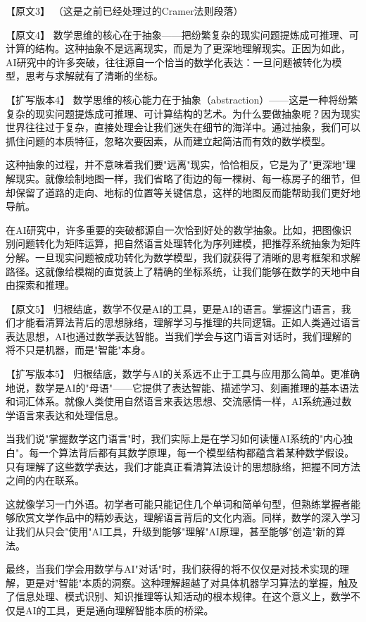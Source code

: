 【原文3】
（这是之前已经处理过的Cramer法则段落）

【原文4】
数学思维的核心在于抽象——把纷繁复杂的现实问题提炼成可推理、可计算的结构。这种抽象不是远离现实，而是为了更深地理解现实。正因为如此，AI研究中的许多突破，往往源自一个恰当的数学化表达：一旦问题被转化为模型，思考与求解就有了清晰的坐标。

【扩写版本4】
数学思维的核心能力在于抽象（abstraction）——这是一种将纷繁复杂的现实问题提炼成可推理、可计算结构的艺术。为什么要做抽象呢？因为现实世界往往过于复杂，直接处理会让我们迷失在细节的海洋中。通过抽象，我们可以抓住问题的本质特征，忽略次要因素，从而建立起简洁而有效的数学模型。

这种抽象的过程，并不意味着我们要"远离"现实，恰恰相反，它是为了"更深地"理解现实。就像绘制地图一样，我们省略了街边的每一棵树、每一栋房子的细节，但却保留了道路的走向、地标的位置等关键信息，这样的地图反而能帮助我们更好地导航。

在AI研究中，许多重要的突破都源自一次恰到好处的数学抽象。比如，把图像识别问题转化为矩阵运算，把自然语言处理转化为序列建模，把推荐系统抽象为矩阵分解。一旦现实问题被成功转化为数学模型，我们就获得了清晰的思考框架和求解路径。这就像给模糊的直觉装上了精确的坐标系统，让我们能够在数学的天地中自由探索和推理。

【原文5】
归根结底，数学不仅是AI的工具，更是AI的语言。掌握这门语言，我们才能看清算法背后的思想脉络，理解学习与推理的共同逻辑。正如人类通过语言表达思想，AI也通过数学表达智能。当我们学会与这门语言对话时，我们理解的将不只是机器，而是"智能"本身。

【扩写版本5】
归根结底，数学与AI的关系远不止于工具与应用那么简单。更准确地说，数学是AI的"母语"——它提供了表达智能、描述学习、刻画推理的基本语法和词汇体系。就像人类使用自然语言来表达思想、交流感情一样，AI系统通过数学语言来表达和处理信息。

当我们说"掌握数学这门语言"时，我们实际上是在学习如何读懂AI系统的"内心独白"。每一个算法背后都有其数学原理，每一个模型结构都蕴含着某种数学假设。只有理解了这些数学表达，我们才能真正看清算法设计的思想脉络，把握不同方法之间的内在联系。

这就像学习一门外语。初学者可能只能记住几个单词和简单句型，但熟练掌握者能够欣赏文学作品中的精妙表达，理解语言背后的文化内涵。同样，数学的深入学习让我们从只会"使用"AI工具，升级到能够"理解"AI原理，甚至能够"创造"新的算法。

最终，当我们学会用数学与AI"对话"时，我们获得的将不仅仅是对技术实现的理解，更是对"智能"本质的洞察。这种理解超越了对具体机器学习算法的掌握，触及了信息处理、模式识别、知识推理等认知活动的根本规律。在这个意义上，数学不仅是AI的工具，更是通向理解智能本质的桥梁。
